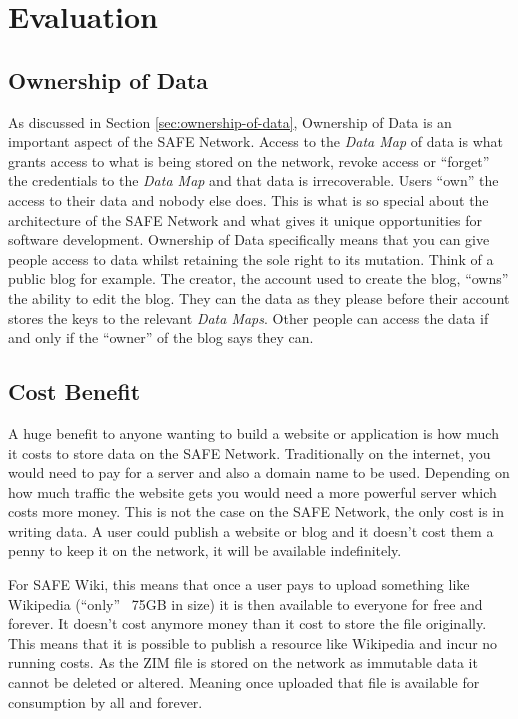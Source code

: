 \chapter{Evaluation}

\section{Ownership of Data}

As discussed in Section \ref{sec:ownership-of-data}, Ownership of Data is an important aspect of the SAFE Network. Access to the \textit{Data Map} of data is what grants access to what is being stored on the network, revoke access or ``forget'' the credentials to the \textit{Data Map} and that data is irrecoverable. Users ``own'' the access to their data and nobody else does. This is what is so special about the architecture of the SAFE Network and what gives it unique opportunities for software development. Ownership of Data specifically means that you can give people access to data whilst retaining the sole right to its mutation. Think of a public blog for example. The creator, the account used to create the blog, ``owns'' the ability to edit the blog. They can the data as they please before their account stores the keys to the relevant \textit{Data Maps}. Other people can access the data if and only if the ``owner'' of the blog says they can. 

 \section{Cost Benefit}
 
 A huge benefit to anyone wanting to build a website or application is how much it costs to store data on the SAFE Network. Traditionally on the internet, you would need to pay for a server and also a domain name to be used. Depending on how much traffic the website gets you would need a more powerful server which costs more money. This is not the case on the SAFE Network, the only cost is in writing data. A user could publish a website or blog and it doesn't cost them a penny to keep it on the network, it will be available indefinitely.
 
 For SAFE Wiki, this means that once a user pays to upload something like Wikipedia (``only'' ~75GB in size) it is then available to everyone for free and forever. It doesn't cost anymore money than it cost to store the file originally. This means that it is possible to publish a resource like Wikipedia and incur no running costs. As the ZIM file is stored on the network as immutable data it cannot be deleted or altered. Meaning once uploaded that file is available for consumption by all and forever.
 
